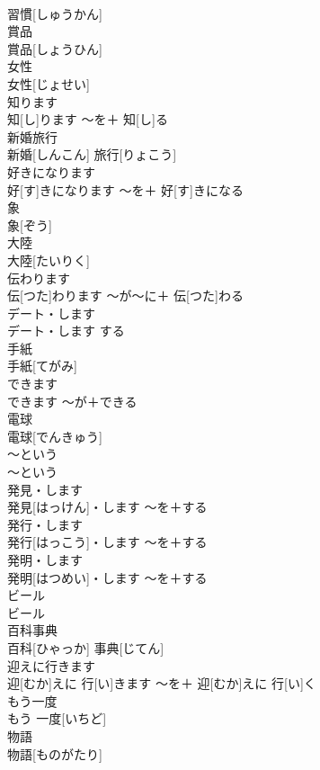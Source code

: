 \documentclass[8pt]{extreport}
\begin{document}
\begin{CJK}{UTF8}{min}
\\	習慣[しゅうかん]		
\\	賞品	
\\	賞品[しょうひん]		
\\	女性	
\\	女性[じょせい]		
\\	知ります	
\\	知[し]ります	〜を＋ 知[し]る	
\\	新婚旅行	
\\	新婚[しんこん] 旅行[りょこう]		
\\	好きになります	
\\	好[す]きになります	〜を＋ 好[す]きになる	
\\	象	
\\	象[ぞう]		
\\	大陸	
\\	大陸[たいりく]		
\\	伝わります	
\\	伝[つた]わります	〜が〜に＋ 伝[つた]わる	
\\	デート・します	
\\	デート・します	する	
\\	手紙	
\\	手紙[てがみ]		
\\	できます	
\\	できます	〜が＋できる	
\\	電球	
\\	電球[でんきゅう]		
\\	〜という	
\\	〜という		
\\	発見・します	
\\	発見[はっけん]・します	〜を＋する	
\\	発行・します	
\\	発行[はっこう]・します	〜を＋する	
\\	発明・します	
\\	発明[はつめい]・します	〜を＋する	
\\	ビール	
\\	ビール		
\\	百科事典	
\\	百科[ひゃっか] 事典[じてん]		
\\	迎えに行きます	
\\	迎[むか]えに 行[い]きます	〜を＋ 迎[むか]えに 行[い]く	
\\	もう一度	
\\	もう 一度[いちど]		
\\	物語	
\\	物語[ものがたり]		

\end{CJK}
\end{document}
